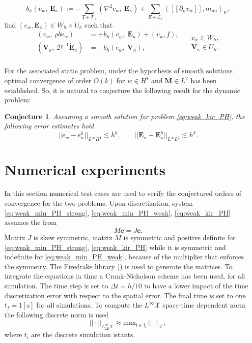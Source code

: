 \documentclass{ifacconf}
\newtheorem{conjecture}{Conjecture}
\begin{document}
\[
b_h(v_w, \ \bm{E}_{\kappa}) := - \sum_{T \in \mathcal{T}_h} ( \nabla^2 v_w, \ \bm{E}_\kappa) + \sum_{E \in \mathcal{E}_h} ([\![\partial_n v_w]\!], m_{\text{nn}})_{E}, 
\]
find $(e_w, \bm{E}_\kappa) \in W_h \times U_h$ such that
\begin{equation}
\label{eq:weak_kir_PH}
\begin{aligned}
(v_w, \ \rho b \dot{e}_w) &= +b_h(v_w, \ \bm{E}_{\kappa}) + (v_w, f), \\ 
(\bm{V}_\kappa, \ \mathcal{D}^{-1} \dot{\bm{E}}_\kappa) &= -b_h(e_w, \ \bm{V}_{\kappa}), \\ 
\end{aligned} \quad
\begin{aligned}
v_w \in W_h, \\
\bm{V}_\kappa \in U_h. \\
\end{aligned}
\end{equation}

For the associated static problem, under the hypothesis of smooth solutions optimal convergence of order $O(k)$ for $w \in H^1$ and $\bm{M} \in L^2$ has been established. So, it is natural to conjecture the following result for the dynamic problem:
\begin{conjecture}
Assuming a smooth solution for problem \eqref{eq:weak_kir_PH}, the following error estimates hold
\begin{equation}
\label{eq:errHHJ}
||e_w - e_w^h||_{L^{\infty} H^1} \lesssim h^{k}, \qquad
||\bm{E}_\kappa - \bm{E}_\kappa^h||_{L^{\infty} L^2} \lesssim h^{k}.
\end{equation}
\end{conjecture}


\section{Numerical experiments}
\label{sec:numerics}
In this section numerical test cases are used to verify the conjectured orders of convergence for the two problems. Upon discretization, system \eqref{eq:weak_min_PH_strong}, \eqref{eq:weak_min_PH_weak}, \eqref{eq:weak_kir_PH} assumes the from 
\[
M \dot{\bm{e}} = J \bm{e}.
\]
Matrix $J$ is skew {\tiny }symmetric, matrix $M$ is symmetric and positive definite for \eqref{eq:weak_min_PH_strong}, \eqref{eq:weak_kir_PH} while it is symmetric and indefinite for \eqref{eq:weak_min_PH_weak}, because of the multiplier that enforces the symmetry. The Firedrake library (\cite{rathgeber2017firedrake}) is used to generate the matrices. To integrate the equations in time a Crank-Nicholson scheme has been used, for all simulation. The time step is set to $\Delta t = h/10$ to have a lower impact of the time discretization error with respect to the spatial error. The final time is set to one $t_f = 1 [\textrm{s}]$ for all simulations. To compute the $L^\infty \mathcal{X}$ space-time dependent norm  the following discrete norm is used
\[
||\cdot ||_{L^\infty_{\Delta t} \mathcal{X}} \approx \mathrm{max}_{t \in t_i} ||\cdot||_{\mathcal{X}},
\]
where $t_i$ are the discrete simulation istants. 
\end{document}

